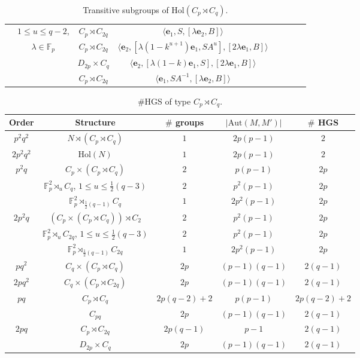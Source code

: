 \documentclass[a4paper,reqno]{amsart}
\theoremstyle{definition}
\newcommand{\e}{\textbf{e}}
\newcommand{\Aut}{\mathrm{Aut}}
\newcommand{\Hol}{\mathrm{Hol}}
\begin{document}
\begin{table}
\begin{tabular}{|c|c|c|c|c|c|c|c|}
        & $1 \leq u \leq q-2$, & $C_p \rtimes C_{2q}$ & $\langle \e_1, S,[\lambda \e_2, B] \rangle$\\ 
        & $\lambda \in \mathbb{F}_p$ &  $C_p \rtimes C_{2q}$  & $\langle \e_2, [\lambda (1-k^{u+1})\e_1, SA^u], [2\lambda \e_1, B] \rangle$\\           
        &  &  $D_{2p} \times C_q$ & $\langle \e_2, [\lambda(1-k)\e_1, S], [2\lambda \e_1,B] \rangle$\\                     
        &  &  $C_p \rtimes C_{2q}$ & $\langle \e_1, SA^{-1}, [\lambda \e_2, B] \rangle$\\ 
        \hline
    \end{tabular}
\vskip3mm
\caption{Transitive subgroups of $\Hol(C_p \rtimes C_q)$.} 
 \label{metab-trans-subgroups}  	
\end{table}
\begin{table}
\centering
\begin{tabular}{|c|c|c|c|c|} \hline
  Order & Structure & $\#$ groups & $|\Aut(M,M')|$ & $\#$ HGS \\ \hline
  $p^2 q^2$ & $N \rtimes (C_p \rtimes C_q)$ & $1$ & $2p(p-1)$ & $2$\\
  \hline
  $2p^2 q^2$ & $\Hol(N)$ & $1$ & $2p(p-1)$ & $2$ \\
  \hline
  $p^2 q$ & $C_p \times (C_p \rtimes C_q)$  & $2$ & $p(p-1)$ & $2p$ \\
  & $\mathbb{F}_p^2 \rtimes_u C_q$, $1 \leq u \leq \frac{1}{2}(q-3)$ & $2$ & $p^2(p-1)$ & $2p$ \\
   & $\mathbb{F}_p^2 \rtimes_{\frac{1}{2}(q-1)} C_q$ & $1$ & $2p^2(p-1)$ & $2p$ \\ 
   \hline
  $2p^2 q$ & $(C_p \times (C_p \rtimes C_q))\rtimes C_2$ & $2$ & $p^2(p-1)$ & $2p$ \\
   & $\mathbb{F}_p^2 \rtimes_u C_{2q}$, $1 \leq u \leq \frac{1}{2}(q-3)$ & $2$ & $p^2(p-1)$ & $2p$ \\
  & $\mathbb{F}_p^2 \rtimes_{\frac{1}{2}(q-1)} C_{2q}$ & $1$ & $2p^2(p-1)$ & $2p$ \\ \hline
  $pq^2$ & $C_q \times (C_p \rtimes C_q)$ & $2p$ & $(p-1)(q-1)$ & $2(q-1)$ \\ \hline
  $2pq^2$ & $C_q \times (C_p \rtimes C_{2q})$ & $2p$ & $(p-1)(q-1)$ & $2(q-1)$ \\ \hline
  $pq$ &  $C_p \rtimes C_q$ & $2p(q-2)+2$ & $p(p-1)$ & $2p(q-2)+2$ \\
   & $C_{pq}$ & $2p$ & $(p-1)(q-1)$ & $2(q-1)$ \\ \hline
  $2pq$ &  $C_p \rtimes C_{2q}$ & $2p(q-1)$ & $p-1$ & $2(q-1)$ \\
   &  $D_{2p} \times C_q$ & $2p$ & $(p-1)(q-1)$ & $2(q-1)$ \\
\hline
\end{tabular}
\vskip3mm
\caption{\#HGS of type $C_p \rtimes C_q$.} 
 \label{metab-trans-HGS}  	
\end{table}
\end{document}
